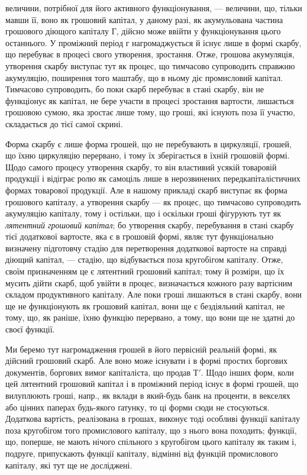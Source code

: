 величини, потрібної для його активного функціонування, — величини,
що, тільки мавши її, воно як грошовий капітал, у даному разі, як акумульована
частина грошового діющого капіталу $Г$, дійсно може ввійти у функціонування
цього останнього. У проміжний період г нагромаджується й
існує лише в формі скарбу, що перебуває в процесі свого утворення, зростання.
Отже, грошова акумуляція, утворення скарбу виступає тут як процес,
що тимчасово супроводить справжню акумуляцію, поширення того маштабу,
що в ньому діє промисловий капітал. Тимчасово супроводить, бо
поки скарб перебуває в стані скарбу, він не функціонує як капітал, не
бере участи в процесі зростання вартости, лишається грошовою сумою,
яка зростає лише тому, що гроші, які існують поза її участю, складається
до тієї самої скрині.

Форма скарбу є лише форма грошей, що не перебувають в циркуляції,
грошей, що їхню циркуляцію перервано, і тому їх зберігається
в їхній грошовій формі. Щодо самого процесу утворення скарбу, то
він властивий усякій товаровій продукції і відіграє ролю як самоціль
лише в нерозвинених передкапіталістичних формах товарової продукції.
Але в нашому прикладі скарб виступає як форма грошового капіталу, а
утворення скарбу — як процес, що тимчасово супроводить акумуляцію
капіталу, тому і остільки, що і оскільки гроші фігурують тут як
\emph{лятентний грошовий капітал}; бо утворення скарбу, перебування в стані
скарбу тієї додаткової вартосте, яка є в грошовій формі, являє тут функціонально
визначену підготовчу стадію для перетворення додаткової
вартосте на справді діющий капітал, — стадію, що відбувається поза
кругобігом капіталу. Отже, своїм призначенням це є лятентний грошовий
капітал; тому й розміри, що їх мусить дійти скарб, щоб увійти в
процес, визначається кожного разу вартісним складом продуктивного
капіталу. Але поки гроші лишаються в стані скарбу, вони ще не функціонують
як грошовий капітал, вони ще є бездіяльний капітал, не тому,
що, як раніше, їхню функцію перервано, а тому, що вони ще не здатні
до своєї функції.

Ми беремо тут нагромадження грошей в його первісній реальній
формі, як дійсний грошовий скарб. Але воно може існувати і в
формі простих боргових документів, боргових вимог капіталіста,
що продав $Т'$. Щодо інших форм, коли цей лятентний грошовий
капітал і в проміжний період існує в формі грошей, що вилуплюють
гроші, напр., як вклади в який-будь банк на проценти, в векселях
або цінних паперах будь-якого ґатунку, то ці форми сюди не стосуються.
Додаткова вартість, реалізована в грошах, виконує тоді особливі функції
капіталу поза кругобігом того промислового капіталу, що з нього
вона походить; функції, що, поперше, не мають нічого спільного з кругобігом
цього капіталу як таким і, подруге, припускають функції капіталу,
відмінні від функцій промислового капіталу, які тут ще не досліджені.

